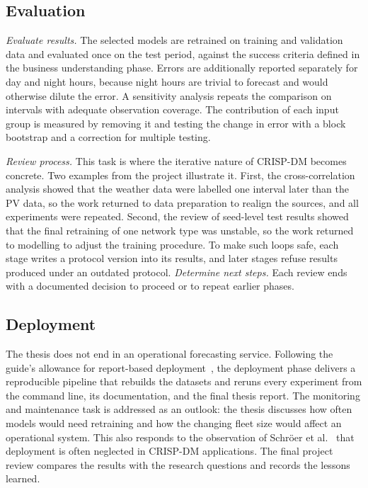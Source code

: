 \documentclass[11pt,a4paper]{article}
\begin{document}
\subsection{Evaluation}

\emph{Evaluate results.} The selected models are retrained on training and
validation data and evaluated once on the test period, against the success
criteria defined in the business understanding phase. Errors are additionally
reported separately for day and night hours, because night hours are trivial to
forecast and would otherwise dilute the error. A sensitivity analysis repeats
the comparison on intervals with adequate observation coverage. The
contribution of each input group is measured by removing it and testing the
change in error with a block bootstrap and a correction for multiple testing.

\emph{Review process.} This task is where the iterative nature of CRISP-DM
becomes concrete. Two examples from the project illustrate it. First, the
cross-correlation analysis showed that the weather data were labelled one
interval later than the PV data, so the work returned to data preparation to
realign the sources, and all experiments were repeated. Second, the review of
seed-level test results showed that the final retraining of one network type
was unstable, so the work returned to modelling to adjust the training
procedure. To make such loops safe, each stage writes a protocol version into
its results, and later stages refuse results produced under an outdated
protocol. \emph{Determine next steps.} Each review ends with a documented
decision to proceed or to repeat earlier phases.

\subsection{Deployment}

The thesis does not end in an operational forecasting service. Following the
guide's allowance for report-based deployment~\cite{chapman2000}, the
deployment phase delivers a reproducible pipeline that rebuilds the datasets and
reruns every experiment from the command line, its documentation, and the final
thesis report. The monitoring and maintenance task is addressed as an outlook:
the thesis discusses how often models would need retraining and how the
changing fleet size would affect an operational system. This also responds to
the observation of Schr\"oer et al.~\cite{schroer2021} that deployment is often
neglected in CRISP-DM applications. The final project review compares the
results with the research questions and records the lessons learned.
\end{document}
